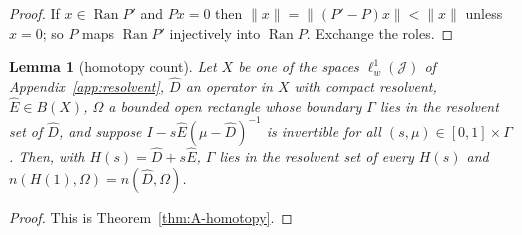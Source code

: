 \documentclass[11pt]{article}
\newtheorem{lemma}{Lemma}[section]
\theoremstyle{definition}
\newcommand{\Ran}{\operatorname{Ran}}
\begin{document}
\begin{proof}
If $x \in \Ran P'$ and $Px = 0$ then $\|x\| = \|(P' - P)x\| < \|x\|$ unless $x = 0$; so $P$ maps $\Ran P'$ injectively into $\Ran P$. Exchange the roles.
\end{proof}

\begin{lemma}[homotopy count]\label{lem:homotopy}
Let $X$ be one of the spaces $\ell^1_w(\mathcal J)$ of Appendix~\ref{app:resolvent}, $\hat D$ an operator in $X$ with compact resolvent, $\hat E \in B(X)$, $\Omega$ a bounded open rectangle whose boundary $\Gamma$ lies in the resolvent set of $\hat D$, and suppose $I - s\hat E(\mu - \hat D)^{-1}$ is invertible for all $(s, \mu) \in [0,1] \times \Gamma$. Then, with $H(s) = \hat D + s\hat E$, $\Gamma$ lies in the resolvent set of every $H(s)$ and $n(H(1), \Omega) = n(\hat D, \Omega)$.
\end{lemma}

\begin{proof}
This is Theorem~\ref{thm:A-homotopy}.
\end{proof}
\end{document}
